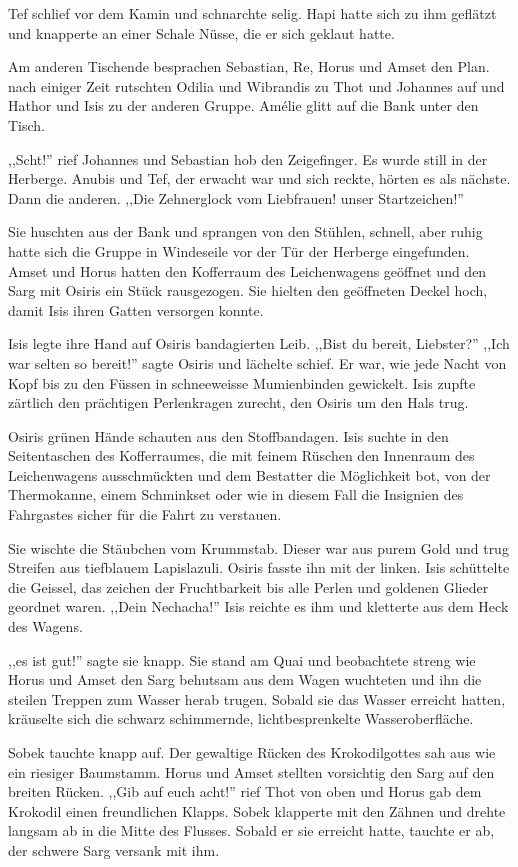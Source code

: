 Tef schlief vor dem Kamin und schnarchte selig. Hapi hatte sich zu ihm geflätzt und knapperte an einer Schale Nüsse, die er sich geklaut hatte. 

Am anderen Tischende besprachen Sebastian, Re, Horus und Amset den Plan. nach einiger Zeit rutschten Odilia und Wibrandis zu Thot und Johannes auf und Hathor und Isis zu der anderen Gruppe. Amélie glitt auf die Bank unter den Tisch.

,,Scht!'' rief Johannes und Sebastian hob den Zeigefinger. Es wurde still in der Herberge. Anubis und Tef, der erwacht war und sich reckte, hörten es als nächste. Dann die anderen. ,,Die Zehnerglock vom Liebfrauen! unser Startzeichen!'' 

Sie huschten aus der Bank und sprangen von den Stühlen, schnell, aber ruhig hatte sich die Gruppe in Windeseile vor der Tür der Herberge eingefunden. Amset und Horus hatten den Kofferraum des Leichenwagens geöffnet und den Sarg mit Osiris ein Stück rausgezogen. Sie hielten den geöffneten Deckel hoch, damit Isis ihren Gatten versorgen konnte.

Isis legte ihre Hand auf Osiris bandagierten Leib. ,,Bist du bereit, Liebster?'' ,,Ich war selten so bereit!'' sagte Osiris und lächelte schief. Er war, wie jede Nacht von Kopf bis zu den Füssen in schneeweisse Mumienbinden gewickelt. Isis zupfte zärtlich den prächtigen Perlenkragen zurecht, den Osiris um den Hals trug.

Osiris grünen Hände schauten aus den Stoffbandagen. Isis suchte in den Seitentaschen des Kofferraumes, die mit feinem Rüschen den Innenraum des Leichenwagens ausschmückten und dem Bestatter die Möglichkeit bot, von der Thermokanne, einem Schminkset oder wie in diesem Fall die Insignien des Fahrgastes sicher für die Fahrt zu verstauen.

Sie wischte die Stäubchen vom Krummstab. Dieser war aus purem Gold und trug Streifen aus tiefblauem Lapislazuli. Osiris fasste ihn mit der linken. Isis schüttelte die Geissel, das zeichen der Fruchtbarkeit bis alle Perlen und goldenen Glieder geordnet waren. ,,Dein Nechacha!'' Isis reichte es ihm und kletterte aus dem Heck des Wagens.

,,es ist gut!'' sagte sie knapp. Sie stand am Quai und beobachtete streng wie Horus und Amset den Sarg behutsam aus dem Wagen wuchteten und ihn die steilen Treppen zum Wasser herab trugen. Sobald sie das Wasser erreicht hatten, kräuselte sich die schwarz schimmernde, lichtbesprenkelte Wasseroberfläche.

Sobek tauchte knapp auf. Der gewaltige Rücken des Krokodilgottes sah aus wie ein riesiger Baumstamm. Horus und Amset stellten vorsichtig den Sarg auf den breiten Rücken. ,,Gib auf euch acht!'' rief Thot von oben und Horus gab dem Krokodil einen freundlichen Klapps. Sobek klapperte mit den Zähnen und drehte langsam ab in die Mitte des Flusses. Sobald er sie erreicht hatte, tauchte er ab, der schwere Sarg versank mit ihm.

